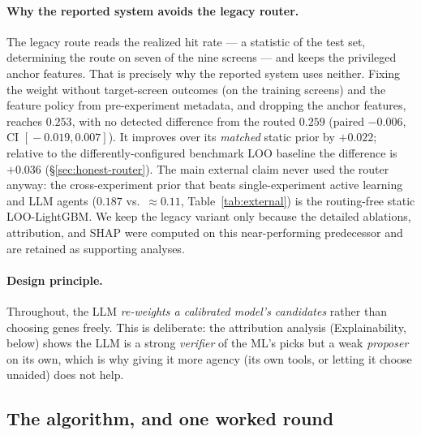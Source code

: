 \documentclass[11pt]{article}
\begin{document}
\paragraph{Why the reported system avoids the legacy router.} The legacy route reads the realized hit
rate --- a statistic of the test set, determining the route on seven of the nine screens --- and keeps the
privileged anchor features. That is precisely why the reported system uses neither. Fixing the weight
without target-screen outcomes (on the training screens) and the feature policy from pre-experiment
metadata, and dropping the anchor features, reaches $0.253$, with no detected difference from the routed
$0.259$ (paired $-0.006$, CI $[\!-\!0.019,0.007]$). It improves over its \emph{matched} static prior by
$+0.022$; relative to the differently-configured benchmark LOO baseline the difference is $+0.036$
(\S\ref{sec:honest-router}). The main external claim never used the router
anyway: the cross-experiment prior that beats single-experiment active learning and LLM agents ($0.187$
vs.\ $\approx\!0.11$, Table~\ref{tab:external}) is the routing-free static LOO-LightGBM. We keep the legacy
variant only because the detailed ablations, attribution, and SHAP were computed on this near-performing
predecessor and are retained as supporting analyses.

\paragraph{Design principle.} Throughout, the LLM \emph{re-weights a calibrated model's candidates}
rather than choosing genes freely. This is deliberate: the attribution analysis
(Explainability, below) shows the LLM is a strong \emph{verifier} of the ML's picks but a weak
\emph{proposer} on its own, which is why giving it more agency (its own tools, or letting it choose
unaided) does not help.

\subsection*{The algorithm, and one worked round}
\end{document}
